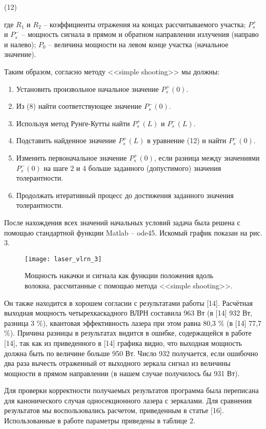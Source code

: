 (12)

где $R_1$ и $R_2$ -- коэффициенты отражения на концах рассчитываемого участка; $P_s^{+}$ и $P_s^{-}$ -- мощность сигнала в прямом и обратном направлении излучения (направо и налево); $P_0$ -- величина мощности на левом конце участка (начальное значение).

Таким образом, согласно методу <<simple shooting>> мы должны:
\begin{enumerate}
  \item Установить произвольное начальное значение $P_s^{+}(0)$.
  \item Из (8) найти соответствующее значение $P_s^{-}(0)$.
  \item Используя метод Рунге-Кутты найти $P_s^{+}(L)$ и $P_s^{-}(L)$.
  \item Подставить найденное значение $P_s^{+}(L)$ в уравнение (12) и найти $P_s^{-}(0)$.
  \item Изменить первоначальное значение $P_s^{+}(0)$, если разница между значениями $P_s^{-}(0)$ на шаге 2 и 4 больше заданного (допустимого) значения толерантности.
  \item Продолжать итеративный процесс до достижения заданного значения толерантности.
\end{enumerate}

После нахождения всех значений начальных условий задача была решена с помощью стандартной функции Matlab – ode45. Искомый график показан на рис. 3.

\begin{figure}[ht]
  \centering
  \texttt{[image: laser\_vlrn\_3]}
  \caption{Мощность накачки и сигнала как функции положения вдоль волокна, рассчитанные с помощью метода <<simple shooting>>.}
  \label{img:laser_vlrn_3}
\end{figure}

Он также находится в хорошем согласии с результатами работы [14]. Расчётная выходная мощность четырехкаскадного ВЛРН составила 963 Вт (в [14] 932 Вт, разница 3 \%), квантовая эффективность лазера при этом равна 80,3 \% (в [14] 77,7 \%). Причина разницы в результатах видится в ошибке, содержащейся в работе [14], так как из приведенного в [14] графика видно, что выходная мощность должна быть по величине больше 950 Вт. Число 932 получается, если ошибочно два раза вычесть отраженный от выходного зеркала сигнал из величины мощности в прямом направлении (в нашем случае получилось бы 931 Вт).

Для проверки корректности получаемых результатов программа была переписана для канонического случая односекционного лазера с зеркалами. Для сравнения результатов мы воспользовались расчетом, приведенным в статье [16]. Использованные в работе параметры приведены в таблице 2.

